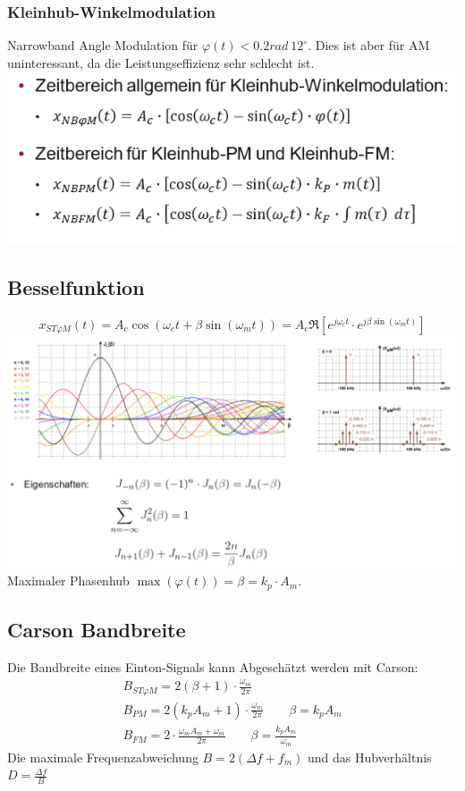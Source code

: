\subsubsection{Kleinhub-Winkelmodulation}
Narrowband Angle Modulation für $\varphi(t) < 0.2rad ~12^\circ$. Dies ist aber für AM uninteressant, da die Leistungseffizienz sehr schlecht ist.
\includegraphics[width=\columnwidth]{Images/screenshot009}

\subsection{Besselfunktion}
\[
x_{ST\varphi M}(t) = A_c \cos(\omega_ct+\beta\sin(\omega_mt)) = A_c \Re[e^{j\omega_ct} \cdot e^{j\beta\sin(\omega_mt)}]
\]
\includegraphics[width=\columnwidth]{Images/besselfunktion}
Maximaler Phasenhub $\max(\varphi(t)) = \beta = k_p\cdot A_m$. 

\subsection{Carson Bandbreite}
Die Bandbreite eines Einton-Signals kann Abgeschätzt werden mit Carson:
\begin{align*}
	B_{ST\varphi M} = 2(\beta + 1)\cdot\frac{\omega_m}{2\pi} \\
	B_{PM} = 2(k_pA_m+1)\cdot\frac{\omega_m}{2\pi} \qquad \beta = k_p A_m \\
	B_{FM} = 2\cdot\frac{\omega_mA_m+\omega_m}{2\pi} \qquad \beta = \frac{k_p A_m}{\omega_m}
\end{align*}
Die maximale Frequenzabweichung $B = 2(\Delta f + f_m)$ und das Hubverhältnis $D = \frac{\Delta f}{B}$ 

